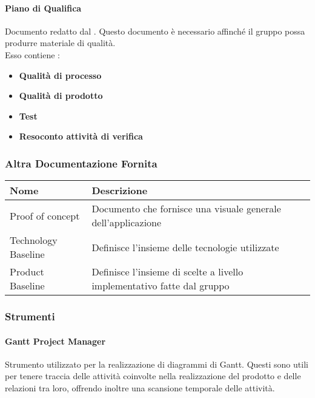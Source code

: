 		\paragraph{Piano di Qualifica}  \hfill \break
			Documento redatto dal .
			Questo documento è necessario affinché il gruppo possa produrre materiale di qualità.\\
			Esso contiene : 
			\begin{itemize}
				\item \textbf{Qualità di processo}
				\item \textbf{Qualità di prodotto}
				\item \textbf{Test}
				\item \textbf{Resoconto attività di verifica}
			\end{itemize}
	
	\subsubsection{Altra Documentazione Fornita}
		\begin{center}
			\renewcommand{\arraystretch}{1.8} %
			\begin{tabular}{ |m{10em}|m{30em}| }
				
				\hline
				\textbf{Nome}			& \textbf{Descrizione} \\
				\hline
				Proof of concept 		& Documento che fornisce una visuale generale dell'applicazione \\
				\hline
				Technology Baseline & Definisce l'insieme delle tecnologie utilizzate\\
				\hline
				Product Baseline & Definisce l'insieme di scelte a livello implementativo fatte dal gruppo\\
				\hline
			\end{tabular}
		\end{center}
		
	\subsubsection{Strumenti}
		\paragraph{Gantt Project Manager} \hfill \break
			Strumento utilizzato per la realizzazione di diagrammi di
			Gantt. Questi sono utili per tenere traccia delle attività
			coinvolte nella realizzazione del prodotto e delle relazioni
			tra loro, offrendo inoltre una scansione temporale delle attività.
	
